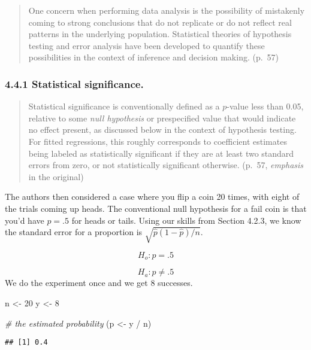 \documentclass[
]{article}
\newenvironment{Shaded}{\begin{snugshade}}{\end{snugshade}}
\newcommand{\CommentTok}[1]{\textcolor[rgb]{0.56,0.35,0.01}{\textit{#1}}}
\newcommand{\DecValTok}[1]{\textcolor[rgb]{0.00,0.00,0.81}{#1}}
\newcommand{\NormalTok}[1]{#1}
\newcommand{\OtherTok}[1]{\textcolor[rgb]{0.56,0.35,0.01}{#1}}
\newcommand{\SpecialCharTok}[1]{\textcolor[rgb]{0.00,0.00,0.00}{#1}}
\begin{document}
\begin{quote}
One concern when performing data analysis is the possibility of
mistakenly coming to strong conclusions that do not replicate or do not
reflect real patterns in the underlying population. Statistical theories
of hypothesis testing and error analysis have been developed to quantify
these possibilities in the context of inference and decision making.
(p.~57)
\end{quote}

\hypertarget{statistical-significance.}{%
\subsubsection{4.4.1 Statistical
significance.}\label{statistical-significance.}}

\begin{quote}
Statistical significance is conventionally defined as a \(p\)-value less
than 0.05, relative to some \emph{null hypothesis} or prespecified value
that would indicate no effect present, as discussed below in the context
of hypothesis testing. For fitted regressions, this roughly corresponds
to coefficient estimates being labeled as statistically significant if
they are at least two standard errors from zero, or not statistically
significant otherwise. (p.~57, \emph{emphasis} in the original)
\end{quote}

The authors then considered a case where you flip a coin 20 times, with
eight of the trials coming up heads. The conventional null hypothesis
for a fail coin is that you'd have \(p = .5\) for heads or tails. Using
our skills from Section 4.2.3, we know the standard error for a
proportion is \(\sqrt{\hat p (1 - \hat p) / n}\).

\[H_o: p=.5\]

\[H_a: p \ne .5\] We do the experiment once and we get 8 successes.

\begin{Shaded}
\begin{Highlighting}[]
\NormalTok{n }\OtherTok{\textless{}{-}} \DecValTok{20}
\NormalTok{y }\OtherTok{\textless{}{-}} \DecValTok{8}

\CommentTok{\# the estimated probability}
\NormalTok{(p }\OtherTok{\textless{}{-}}\NormalTok{ y }\SpecialCharTok{/}\NormalTok{ n)}
\end{Highlighting}
\end{Shaded}

\begin{verbatim}
## [1] 0.4
\end{verbatim}
\end{document}
